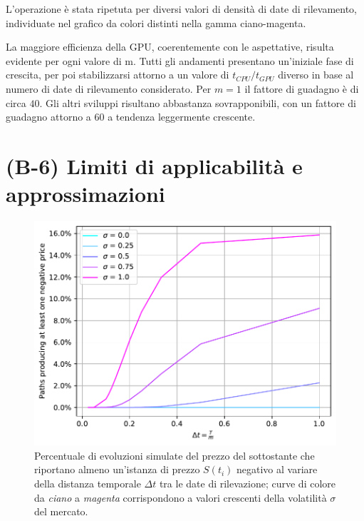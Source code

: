 L'operazione è stata ripetuta per diversi valori di densità di date di rilevamento, individuate nel grafico da colori distinti nella gamma ciano-magenta.

La maggiore efficienza della GPU, coerentemente con le aspettative, risulta evidente per ogni valore di m. Tutti gli andamenti presentano un'iniziale fase di crescita, per poi stabilizzarsi attorno a un valore di $t_{CPU}/t_{GPU}$ diverso in base al numero di date di rilevamento considerato. Per $m=1$ il fattore di guadagno è di circa $40$. Gli altri sviluppi risultano abbastanza sovrapponibili, con un fattore di guadagno attorno a $60$ a tendenza leggermente crescente.

\section{(B-6) Limiti di applicabilità e approssimazioni} \label{sec:limits}

\begin{figure}[t] 
    \centering
    \includegraphics[scale=0.5]{graphs/NegativePrices_PercentageVsM_VariousSigmas.pdf}
    \caption{Percentuale di evoluzioni simulate del prezzo del sottostante che riportano almeno un'istanza di prezzo $S(t_i)$ negativo al variare della distanza temporale $\Delta t$ tra le date di rilevazione; curve di colore da \textit{ciano} a \textit{magenta} corrispondono a valori crescenti della volatilità $\sigma$ del mercato.}
    \label{fig:negativeprices}
\end{figure}
\lipsum[1-3]